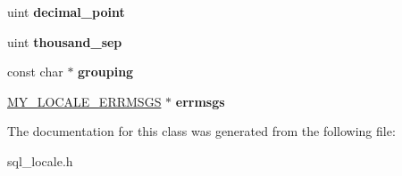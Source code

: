 \begin{DoxyCompactItemize}
uint {\bfseries decimal\+\_\+point}
\item 
\mbox{\label{classMY__LOCALE_a500a3af8650d2f63b4d4fa36554e7310}} 
uint {\bfseries thousand\+\_\+sep}
\item 
\mbox{\label{classMY__LOCALE_a59788531a4e21e2b4108dc355f050ba3}} 
const char $\ast$ {\bfseries grouping}
\item 
\mbox{\label{classMY__LOCALE_aa588ca89c7fc3e63ae2c8ec2729f6849}} 
\mbox{\hyperlink{classMY__LOCALE__ERRMSGS}{M\+Y\+\_\+\+L\+O\+C\+A\+L\+E\+\_\+\+E\+R\+R\+M\+S\+GS}} $\ast$ {\bfseries errmsgs}
\end{DoxyCompactItemize}


The documentation for this class was generated from the following file\+:\begin{DoxyCompactItemize}
\item 
sql\+\_\+locale.\+h\end{DoxyCompactItemize}
